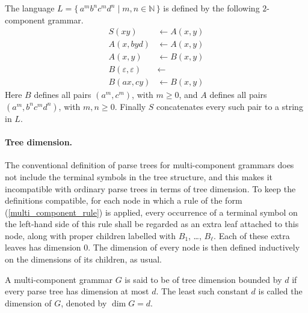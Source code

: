 \documentclass[runningheads]{llncs}
\newcommand{\set}[2]{\{ \, #1 \mid #2 \, \}}
\renewcommand{\epsilon}{\varepsilon}
\begin{document}

\begin{example}\label{exam-well-nested}
The language $L = \set{a^m b^n c^m d^n}{m, n \in \mathbb{N}}$
is defined by the following %
$2$-component grammar.
\begin{align*}
	S(xy) &\leftarrow A(x, y) \\
	A(x, byd) &\leftarrow A(x, y) \\
	A(x, y) &\leftarrow B(x, y) \\
	B(\epsilon, \epsilon) &\leftarrow \\
	B(ax, cy) &\leftarrow B(x, y)
\end{align*}
Here $B$ defines all pairs $(a^m, c^m)$, with $m \geqslant 0$,
and $A$ defines all pairs $(a^m, b^n c^m d^n)$, with $m,n \geqslant 0$.
Finally $S$ concatenates every such pair to a string in $L$.
\end{example}

\paragraph{Tree dimension.}
The conventional definition of parse trees for multi-component grammars
does not include the terminal symbols in the tree structure,
and this makes it incompatible with ordinary parse trees in terms of tree dimension.
To keep the definitions compatible,
for each node in which a rule of the form (\ref{multi_component_rule}) is applied,
every occurrence of a terminal symbol on the left-hand side of this rule
shall be regarded as an extra leaf attached to this node,
along with proper children labelled with $B_1$, \ldots, $B_\ell$.
Each of these extra leaves has dimension 0.
The dimension of every node is then defined inductively
on the dimensions of its children, as usual.

\begin{definition}
A multi-component grammar $G$ is said to be of tree dimension bounded by $d$
if every parse tree has dimension at most $d$.
The least such constant $d$ is called the dimension of $G$, denoted by $\dim G=d$.
\end{definition}
\end{document}
